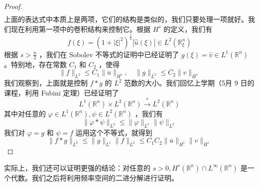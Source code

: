 \begin{proof}
\[\begin{aligned}
\end{aligned}
\]
上面的表达式中本质上是两项，它们的结构是类似的，我们只要处理一项就好。我们现在利用第一项中的卷积结构来控制它。根据 $H^s$ 的定义，我们有
\[
f(\xi)=\left(1+|\xi|^2\right)^{\frac{s}{2}}|\widehat{u}(\xi)| \in L^2\left(\mathbb{R}_{\xi}^n\right)
\]
根据 $s>\frac{n}{2}$ ，我们在 Sobolev 不等式的证明中已经证明了 $g(\xi)=\widehat{v} \in L^1\left(\mathbb{R}^n\right)$ 。特别地，存在常数 $C_1$ 和 $C_2$ ，使得
\[
\|f\|_{L^2} \leqslant C_1\|\overline{u}\|_{H^s}, \quad\|g\|_{L^2} \leqslant C_2\|v\|_{H^s}
\]
我们观察到，上面就是控制 $f * g$ 的 $L^2$ 范数的大小。我们回忆上学期（5月 9 日的课程，利用 Fubini 定理）已经证明了
\[
L^1\left(\mathbb{R}^n\right) \times L^2\left(\mathbb{R}^n\right) \xrightarrow{*} L^2\left(\mathbb{R}^n\right)
\]
其中对任意的 $\varphi \in L^1\left(\mathbb{R}^n\right), \psi \in L^2\left(\mathbb{R}^n\right)$ ，我们有
\[
\|\varphi * \psi\|_{L^2} \leqslant\|\varphi\|_{L^1}\|\psi\|_{L^2}
\]
我们对 $\varphi=g$ 和 $\psi=f$ 运用这个不等式，就得到
\[
\|f * g\|_{L^2} \leqslant\|g\|_{L^1}\|f\|_{L^2} \leqslant C_1 C_2\|\overline{u}\|_{H^s}\|v\|_{H^s}
\]
\end{proof}

实际上，我们还可以证明更强的结论：对任意的 $s>0, H^s\left(\mathbb{R}^n\right) \cap L^{\infty}\left(\mathbb{R}^n\right)$ 是一个代数。我们之后将利用频率空间的二进分解进行证明。
